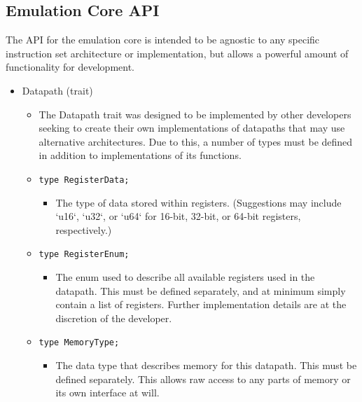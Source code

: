\documentclass[
    paper=letter,
    parskip=half,
    fontsize=12pt,
    titlepage=firstiscover,
    toc=bibliography,
    numbers=endperiod
]{scrartcl}
\providecommand{\tightlist}{%
  \setlength{\itemsep}{0pt}\setlength{\parskip}{0pt}}
\begin{document}

\subsection{Emulation Core API}
\label{subsec:emulation-core-api}

The API for the emulation core is intended to be agnostic to any
specific instruction set architecture or implementation, but allows a
powerful amount of functionality for development.

\begin{itemize}
    \tightlist
    \item Datapath (trait)
    \begin{itemize}
        \tightlist
        \item The Datapath trait was designed to be implemented by other
            developers seeking to create their own implementations of datapaths
            that may use alternative architectures. Due to this, a number of
            types must be defined in addition to implementations of its
            functions.
        \item \texttt{type RegisterData;}
        \begin{itemize}
            \tightlist
                \item The type of data stored within registers. (Suggestions may include
                `u16`, `u32`, or `u64` for 16-bit, 32-bit, or 64-bit registers,
                respectively.)
        \end{itemize}
        \item \texttt{type RegisterEnum;}
        \begin{itemize}
            \tightlist
            \item The enum used to describe all available registers used in the
            datapath. This must be defined separately, and at minimum simply
            contain a list of registers. Further implementation details are at
            the discretion of the developer.
        \end{itemize}
        \item \texttt{type MemoryType;}
        \begin{itemize}
            \tightlist
            \item The data type that describes memory for this datapath. This must
            be defined separately. This allows raw access to any parts of
            memory or its own interface at will.
        \end{itemize}

\end{itemize}
\end{itemize}
\end{document}
